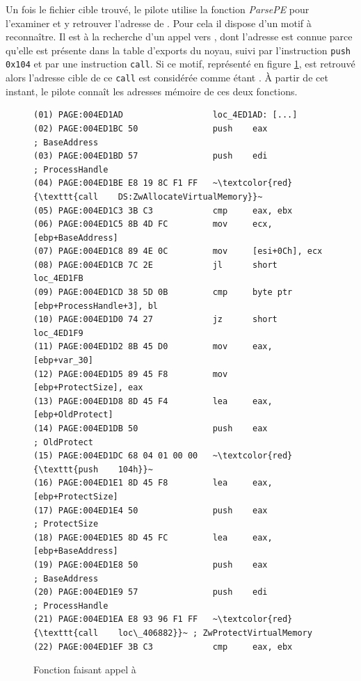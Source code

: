 Un fois le fichier cible trouvé, le pilote utilise la fonction \emph{ParsePE} pour l'examiner et y retrouver l'adresse de \ZwP.
Pour cela il dispose d'un motif à reconnaître.
Il est à la recherche d'un appel vers \ZwA, dont l'adresse est connue parce qu'elle est présente dans la table d'exports du noyau, suivi par l'instruction \texttt{push 0x104} et par une instruction \texttt{call}.
Si ce motif, représenté en figure \ref{fig:CallZwProtect}, est retrouvé alors l'adresse cible de ce \texttt{call} est considérée comme étant \ZwP.
À partir de cet instant, le pilote connaît les adresses mémoire de ces deux fonctions.

\begin{figure}[h]
\begin{center}
\scriptsize
\begin{lstlisting}[language={[x86masm]Assembler}, escapechar=~]
(01) PAGE:004ED1AD                  loc_4ED1AD: [...]                      
(02) PAGE:004ED1BC 50               push    eax             ; BaseAddress
(03) PAGE:004ED1BD 57               push    edi             ; ProcessHandle
(04) PAGE:004ED1BE E8 19 8C F1 FF   ~\textcolor{red}{\texttt{call    DS:ZwAllocateVirtualMemory}}~
(05) PAGE:004ED1C3 3B C3            cmp     eax, ebx
(06) PAGE:004ED1C5 8B 4D FC         mov     ecx, [ebp+BaseAddress]
(07) PAGE:004ED1C8 89 4E 0C         mov     [esi+0Ch], ecx
(08) PAGE:004ED1CB 7C 2E            jl      short loc_4ED1FB
(09) PAGE:004ED1CD 38 5D 0B         cmp     byte ptr [ebp+ProcessHandle+3], bl
(10) PAGE:004ED1D0 74 27            jz      short loc_4ED1F9
(11) PAGE:004ED1D2 8B 45 D0         mov     eax, [ebp+var_30]
(12) PAGE:004ED1D5 89 45 F8         mov     [ebp+ProtectSize], eax
(13) PAGE:004ED1D8 8D 45 F4         lea     eax, [ebp+OldProtect]
(14) PAGE:004ED1DB 50               push    eax             ; OldProtect
(15) PAGE:004ED1DC 68 04 01 00 00   ~\textcolor{red}{\texttt{push    104h}}~
(16) PAGE:004ED1E1 8D 45 F8         lea     eax, [ebp+ProtectSize]
(17) PAGE:004ED1E4 50               push    eax             ; ProtectSize
(18) PAGE:004ED1E5 8D 45 FC         lea     eax, [ebp+BaseAddress]
(19) PAGE:004ED1E8 50               push    eax             ; BaseAddress
(20) PAGE:004ED1E9 57               push    edi             ; ProcessHandle
(21) PAGE:004ED1EA E8 93 96 F1 FF   ~\textcolor{red}{\texttt{call    loc\_406882}}~ ; ZwProtectVirtualMemory
(22) PAGE:004ED1EF 3B C3            cmp     eax, ebx
\end{lstlisting}
\end{center}
\caption{Fonction faisant appel à \ZwP\label{fig:CallZwProtect}}
\end{figure}

